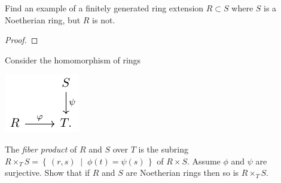 \begin{problem}
Find an example of a finitely generated ring extension $R\subset
S$ where $S$ is a Noetherian ring, but $R$ is not.
\end{problem}
\begin{proof}
\end{proof}
\newpage
\begin{problem}
Consider the homomorphism of rings
\begin{center}
\includegraphics{figures/hw-4-ring-maps}
\end{center}
The \emph{fiber product} of $R$ and $S$ over $T$ is the subring
$R\times_T S=\left\{\,(r,s)\;\middle|\;\phi(t)=\psi(s)\,\right\}$
of $R\times S$. Assume $\phi$ and $\psi$ are surjective. Show
that if $R$ and $S$ are Noetherian rings then so is $R\times_T
S$.
\end{problem}
